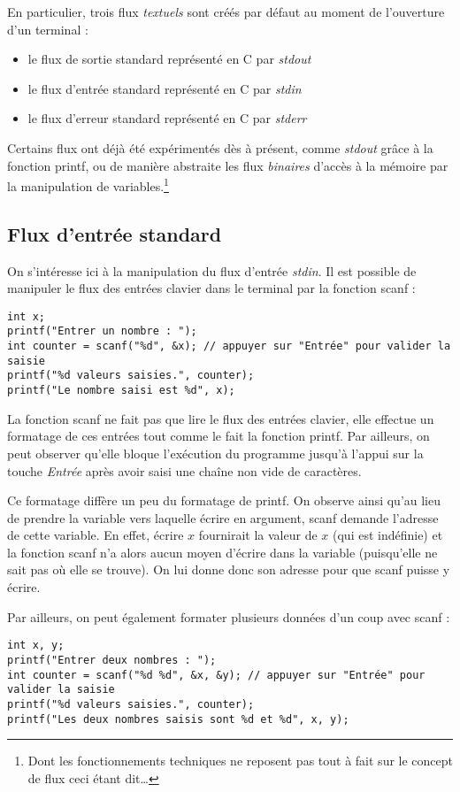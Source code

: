 \documentclass[../../../main.tex]{subfiles}
\begin{document}
En particulier, trois flux \textit{textuels} sont créés par défaut au moment de l'ouverture d'un terminal :
\begin{itemize}
	\item le flux de sortie standard représenté en C par \textit{stdout}
	\item le flux d'entrée standard représenté en C par \textit{stdin}
	\item le flux d'erreur standard représenté en C par \textit{stderr}
\end{itemize}
Certains flux ont déjà été expérimentés dès à présent, comme \textit{stdout} grâce à la fonction \textsf{printf}, ou de manière abstraite les flux \textit{binaires} d'accès à la mémoire par la manipulation de variables.\footnote{Dont les fonctionnements techniques ne reposent pas tout à fait sur le concept de flux ceci étant dit\dots }
 
\subsection{Flux d'entrée standard}
\label{sub:flux_d_entr_e_standard}
On s'intéresse ici à la manipulation du flux d'entrée \textit{stdin}. Il est possible de manipuler le flux des entrées clavier dans le terminal par la fonction \textsf{scanf} :
\begin{verbatim}
int x;
printf("Entrer un nombre : ");
int counter = scanf("%d", &x); // appuyer sur "Entrée" pour valider la saisie
printf("%d valeurs saisies.", counter);
printf("Le nombre saisi est %d", x);
\end{verbatim}
La fonction \textsf{scanf} ne fait pas que lire le flux des entrées clavier, elle effectue un formatage de ces entrées tout comme le fait la fonction \textsf{printf}. Par ailleurs, on peut observer qu'elle bloque l'exécution du programme jusqu'à l'appui sur la touche \textit{Entrée} après avoir saisi une chaîne non vide de caractères.
 
Ce formatage diffère un peu du formatage de \textsf{printf}. On observe ainsi qu'au lieu de prendre la variable vers laquelle écrire en argument, \textsf{scanf} demande l'adresse de cette variable. En effet, écrire $x$ fournirait la valeur de $x$ (qui est indéfinie) et la fonction \textsf{scanf} n'a alors aucun moyen d'écrire dans la variable (puisqu'elle ne sait pas où elle se trouve). On lui donne donc son adresse pour que \textsf{scanf} puisse y écrire.
 
Par ailleurs, on peut également formater plusieurs données d'un coup avec \textsf{scanf} :
\begin{listing}[ht]
	\begin{verbatim}
int x, y;
printf("Entrer deux nombres : ");
int counter = scanf("%d %d", &x, &y); // appuyer sur "Entrée" pour valider la saisie
printf("%d valeurs saisies.", counter);
printf("Les deux nombres saisis sont %d et %d", x, y);
	\end{verbatim}
	\label{lst:prgm1}
\end{listing}
\end{document}
